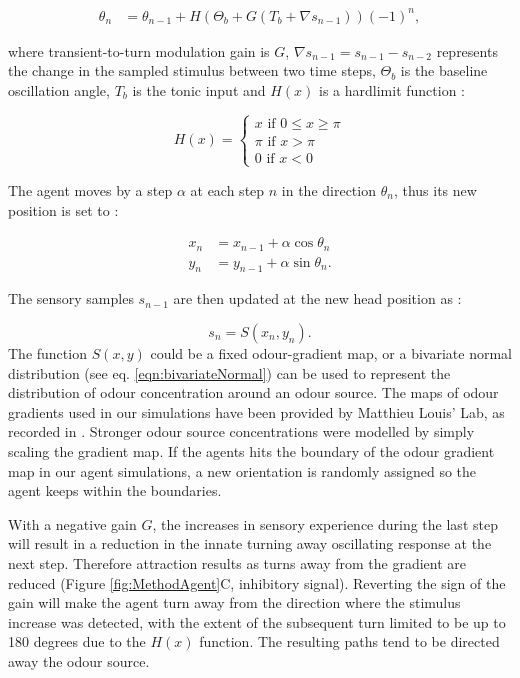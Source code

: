 \documentclass[11pt,a4paper]{article}
\begin{document}
\begin{align}
\theta_n &= \theta_{n-1} + H(\Theta_b + G (T_b + \nabla s_{n-1})){(-1)}^n,
\label{eqn:Discretemodel}
\end{align}

where  transient-to-turn modulation gain is $G$, $\nabla s_{n-1}  = s_{n-1} - s_{n-2}$ represents the change in the sampled stimulus between two time steps, $\Theta_b$ is the baseline oscillation angle, $T_b$ is the tonic input and $H(x)$ is a hardlimit function :

\begin{equation}
H(x) =
\begin{cases}
x \mbox{ if } 0 \leq x \geq \pi \\
\pi \mbox{ if } x > \pi  \\
0 \mbox{ if } x < 0 
\end{cases}
\end{equation}

The agent moves by a step $\alpha$ at each step $n$ in the direction $\theta_n$, thus its new position is set to :

\begin{align}
x_n &= x_{n-1}+ \alpha \cos \theta_{n} \\
y_n &= y_{n-1}+ \alpha  \sin \theta_{n}.
\end{align}

The sensory samples $s_{n-1}$ are then updated at the new head position as :

\begin{equation}
s_n = S(x_n,y_n).
\end{equation}
The function $S(x,y)$ could be a  fixed odour-gradient map, or a bivariate normal distribution (see eq. \eqref{eqn:bivariateNormal}) can be used to represent the distribution of odour concentration around an odour source. 
 The maps of odour gradients used in our simulations have been provided by Matthieu Louis' Lab, as recorded in \citep{gomez2014multilevel}. Stronger odour source concentrations were modelled by simply scaling the gradient map.
If the agents hits the boundary of the odour gradient map in our agent simulations, a new  orientation is randomly assigned so the agent keeps within the boundaries.

With a negative gain $G$, the increases in sensory experience during the last step will result in a reduction in the innate turning away oscillating response at the next step. Therefore attraction results as turns away from the gradient are reduced (Figure \ref{fig:MethodAgent}C, inhibitory signal). Reverting the sign of the gain will make the agent turn away from the direction where the stimulus increase was detected, with the extent of the subsequent turn limited to be up to 180 degrees due to the $H(x)$ function. The resulting paths tend to be directed away the odour source. 
\end{document}
